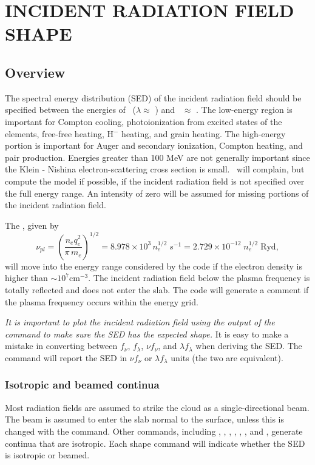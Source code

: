 \chapter{INCIDENT RADIATION FIELD SHAPE}
\label{sec:IncidentContinuumShape}

\section{Overview}

The spectral energy distribution (SED) of the
incident radiation field should be specified
between the energies of \emm\ ($\lambda \approx$ \emmcm )
and \egamrymev \ $\approx$ \egamry .
The low-energy region is important for Compton cooling,
photoionization
from excited states of the elements, free-free heating, H$^-$ heating,
and grain heating.
The high-energy portion is important for Auger and secondary
ionization, Compton heating, and pair production.
Energies greater than
100 MeV are not generally important since the Klein - Nishina
electron-scattering cross section is small.
\Cloudy\ will complain, but compute
the model if possible, if the
incident radiation field is not specified over the full energy range.
An intensity of zero will be assumed for missing portions of the
incident radiation field.

The , given by
\begin{equation}
\nu _{pl}  = \left( {\frac{{n_e q_e^2 }}{{\pi \,m_e }}} \right)^{1/2}  =
8.978 \times 10^3 \,n_e^{1/2} \;s^{ - 1}  = 2.729 \times 10^{ - 12}
\;n_e^{1/2} \;{\mathrm{Ryd}},%
\end{equation}
will move into the energy range considered by the code if the electron
density is higher than $\sim 10^7 \mathrm{cm}^{-3}$.
The incident radiation field below the
plasma frequency is totally reflected and does not enter the slab.
The code will generate a comment if the plasma frequency occurs within
the energy grid.

\emph{It is important to plot the incident radiation
field using the output of the
 command to make sure the SED has the expected shape.}
It is easy to make a mistake in converting between $f_\nu$, $f_\lambda$,
$\nu f_\nu$, and $\lambda f_\lambda$ when deriving the SED.
The  command will report the SED in 
$\nu f_\nu$ or $\lambda f_\lambda$ units (the two are equivalent).

\subsection{Isotropic and beamed continua}
Most radiation fields are assumed to strike the cloud as a
single-directional beam.
The beam is assumed to enter the slab normal to
the surface, unless this is changed with the
 command.
Other commands, including
, , %
, ,
, , and ,
generate continua that are isotropic.
Each shape command will indicate whether the SED is isotropic or beamed.

